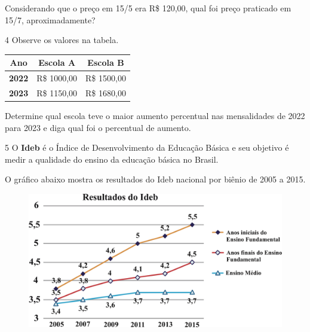 Considerando que o preço em 15/5 era R\$ 120,00, qual foi preço praticado
em 15/7, aproximadamente?

\begin{emptybox}
\end{emptybox}

\num{4} Observe os valores na tabela. 

\begin{center}
\begin{tabular}{|lll|}
\hline
\multicolumn{1}{|c}{\textbf{Ano}} & \multicolumn{1}{c}{\textbf{Escola A}} & \multicolumn{1}{c|}{\textbf{Escola B}} \\ \hline
\textbf{2022} & R\$ 1000,00 & R\$ 1500,00 \\ \hline
\textbf{2023} & R\$ 1150,00 & R\$ 1680,00 \\ \hline
\end{tabular}
\end{center}

Determine qual escola teve o maior aumento percentual nas mensalidades
de 2022 para 2023 e diga qual foi o percentual de aumento.

\begin{emptybox}
\end{emptybox}

\num{5} O \textbf{Ideb} é o Índice de Desenvolvimento da
Educação Básica e seu objetivo é medir a qualidade do ensino da
educação básica no Brasil.

O gráfico abaixo mostra os resultados do Ideb nacional por biênio de
2005 a 2015.

\begin{figure}[htpb!]
\centering
\includegraphics[width=.8\textwidth]{./ilustras-mat/modulo_4-atividade_5.png}
\end{figure}

